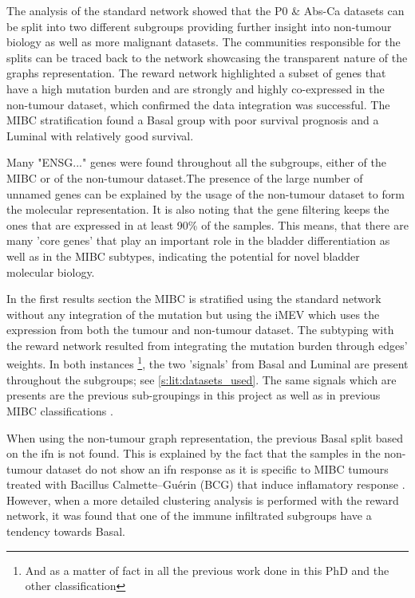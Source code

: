 The analysis of the standard network showed that the P0 \& Abs-Ca datasets can be split into two different subgroups providing further insight into non-tumour biology as well as more malignant datasets. The communities responsible for the splits can be traced back to the network showcasing the transparent nature of the graphs representation. The reward network highlighted a subset of genes that have a high mutation burden and are strongly and highly co-expressed in the non-tumour dataset, which confirmed the data integration was successful. The MIBC stratification found a Basal group with poor survival prognosis and a Luminal with relatively good survival.

Many "ENSG..." genes were found throughout all the subgroups, either of the MIBC or of the non-tumour dataset.The presence of the large number of unnamed genes can be explained by the usage of the non-tumour dataset to form the molecular representation. It is also noting that the gene filtering keeps the ones that are expressed in at least 90\% of the samples. This means, that there are many 'core genes' that play an important role in the bladder differentiation as well as in the MIBC subtypes, indicating the potential for novel bladder molecular biology. 

In the first results section the MIBC is stratified using the standard network without any integration of the mutation but using the iMEV which uses the expression from both the tumour and non-tumour dataset. The subtyping with the reward network resulted from integrating the mutation burden through edges' weights. In both instances \footnote{And as a matter of fact in all the previous work done in this PhD and the other classification}, the two 'signals' from Basal and Luminal are present throughout the subgroups; see \cref{s:lit:datasets_used}. The same signals which are presents are the previous sub-groupings in this project as well as in previous MIBC classifications \citet{Robertson2017-mg, Kamoun2020-tj, Marzouka2018-ge}.

When using the non-tumour graph representation, the previous Basal split based on the \acrfull{ifn} is not found. This is explained by the fact that the samples in the non-tumour dataset do not show an \acrshort{ifn} response as it is specific to MIBC tumours treated with Bacillus Calmette–Guérin (BCG) that induce inflamatory response \citep{Baker2022-bj}. However, when a more detailed clustering analysis is performed with the reward network, it was found that one of the immune infiltrated subgroups have a tendency towards Basal.

